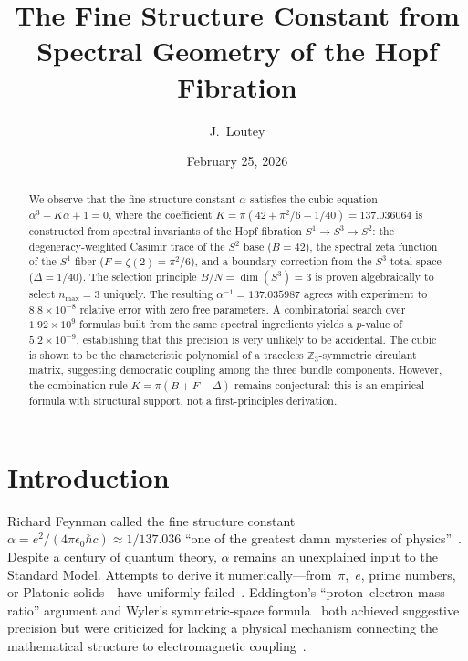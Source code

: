 \documentclass[aps,prl,twocolumn,superscriptaddress]{revtex4-2}
\begin{document}
\title{The Fine Structure Constant from Spectral Geometry of the Hopf Fibration}

\author{J.~Loutey}

\date{February 25, 2026}

\begin{abstract}
We observe that the fine structure constant $\alpha$ satisfies the cubic
equation $\alpha^3 - K\alpha + 1 = 0$, where the coefficient
$K = \pi(42 + \pi^2/6 - 1/40) = 137.036064$ is constructed from
spectral invariants of the Hopf fibration $S^1 \to S^3 \to S^2$: the
degeneracy-weighted Casimir trace of the $S^2$ base ($B = 42$), the
spectral zeta function of the $S^1$ fiber ($F = \zeta(2) = \pi^2/6$),
and a boundary correction from the $S^3$ total space
($\Delta = 1/40$). The selection principle $B/N = \dim(S^3) = 3$ is
proven algebraically to select $n_{\max} = 3$ uniquely. The resulting
$\alpha^{-1} = 137.035987$ agrees with experiment to
$8.8 \times 10^{-8}$ relative error with zero free parameters. A
combinatorial search over $1.92 \times 10^9$ formulas built from the
same spectral ingredients yields a $p$-value of
$5.2 \times 10^{-9}$, establishing that this precision is very
unlikely to be accidental. The cubic is shown to be the characteristic
polynomial of a traceless $\mathbb{Z}_3$-symmetric circulant matrix,
suggesting democratic coupling among the three bundle components.
However, the combination rule $K = \pi(B + F - \Delta)$ remains
conjectural: this is an empirical formula with structural support, not
a first-principles derivation.
\end{abstract}

\maketitle

\section{Introduction}

Richard Feynman called the fine structure constant
$\alpha = e^2/(4\pi\epsilon_0\hbar c) \approx 1/137.036$ ``one of the
greatest damn mysteries of physics''~\cite{feynman1985}. Despite a
century of quantum theory, $\alpha$ remains an unexplained input to
the Standard Model. Attempts to derive it
numerically---from~$\pi$,~$e$, prime numbers, or Platonic
solids---have uniformly failed~\cite{eddington1935,barrow2002}.
Eddington's ``proton--electron mass ratio'' argument and Wyler's
symmetric-space formula~\cite{wyler1969} both achieved suggestive
precision but were criticized for lacking a physical mechanism
connecting the mathematical structure to electromagnetic
coupling~\cite{robertson1971}.
\end{document}
